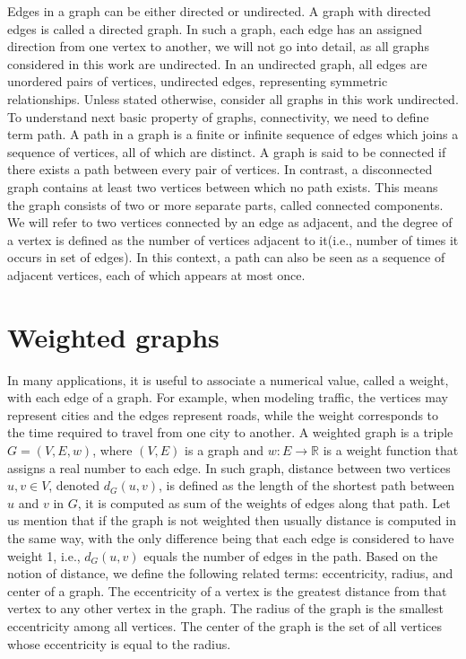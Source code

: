 \documentclass[12pt]{book}
\begin{document}
		Edges in a graph can be either directed or undirected. A graph with directed edges is called a directed graph. In such a graph, each edge has an assigned direction from one vertex to another, we will not go into detail, as all graphs considered in this work are undirected. In an undirected graph, all edges are unordered pairs of vertices, undirected edges, representing symmetric relationships. Unless stated otherwise, consider all graphs in this work undirected.
		To understand next basic property of graphs, connectivity, we need to define term path. A path in a graph is a finite or infinite sequence of edges which joins a sequence of vertices, all of which are distinct. A graph is said to be connected if there exists a path between every pair of vertices. In contrast, a disconnected graph contains at least two vertices between which no path exists. This means the graph consists of two or more separate parts, called connected components. 
		We will refer to two vertices connected by an edge as adjacent, and the degree of a vertex is defined as the number of vertices adjacent to it(i.e., number of times it occurs in set of edges). In this context, a path can also be seen as a sequence of adjacent vertices, each of which appears at most once.
	
	\section{Weighted graphs}	
		In many applications, it is useful to associate a numerical value, called a weight, with each edge of a graph. For example, when modeling traffic, the vertices may represent cities and the edges represent roads, while the weight corresponds to the time required to travel from one city to another. 
		A weighted graph is a triple \( G = (V, E, w) \), where \( (V, E) \) is a graph and \( w : E \to \mathbb{R} \) is a weight function that assigns a real number to each edge. 
		In such graph, distance between two vertices \( u, v \in V \), denoted \( d_G(u,v) \),  is defined as the length of the shortest path between \( u \) and \( v \) in \( G \), it is computed as sum of the weights of edges along that path. Let us mention that if the graph is not weighted then usually distance is computed in the same way, with the only difference being that each edge is considered to have weight 1, i.e., \( d_G(u,v) \) equals the number of edges in the path.
		Based on the notion of distance, we define the following related terms: eccentricity, radius, and center of a graph. The eccentricity of a vertex is the greatest distance from that vertex to any other vertex in the graph. The radius of the graph is the smallest eccentricity among all vertices. The center of the graph is the set of all vertices whose eccentricity is equal to the radius.
		
\end{document}
